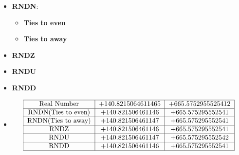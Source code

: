 \begin{frame}
\begin{itemize}
    \item <1-> \textbf{RNDN}: 
    \begin{itemize}
        \item \textbf{Ties to even}
         
        \item \textbf{Ties to away}
       
    \end{itemize}
    \item <2->\textbf{RNDZ}
    \item <3->\textbf{RNDU}
    \item <4->\textbf{RNDD}
\item <5->
\begin{table}[hbtp]
        \centering
    $$\begin{tabular}{|c|c|c|}
    \hline
    Real Number & +140.8215064611465 & +665.5752955525412\\
    \hline
    RNDN(Ties to even) & +140.821506461146 & +665.575295552541\\
    \hline
    RNDN(Ties to away) & +140.821506461147 & +665.575295552541\\
    \hline
    RNDZ & +140.821506461146 & +665.575295552541\\
    \hline
    RNDU & +140.821506461147 & +665.575295552542\\ 
    \hline
    RNDD & +140.821506461146 & +665.575295552541\\
    \hline
    \end{tabular}$$
\end{table}
\end{itemize}
\end{frame}

